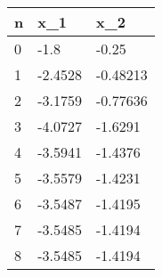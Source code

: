\begin{tabular}{lll}
n & x_{1} & x_{2} \\ 
\hline 
0 & -1.8 & -0.25 \\ 
1 & -2.4528 & -0.48213 \\ 
2 & -3.1759 & -0.77636 \\ 
3 & -4.0727 & -1.6291 \\ 
4 & -3.5941 & -1.4376 \\ 
5 & -3.5579 & -1.4231 \\ 
6 & -3.5487 & -1.4195 \\ 
7 & -3.5485 & -1.4194 \\ 
8 & -3.5485 & -1.4194 \\ 
\hline 
\end{tabular}